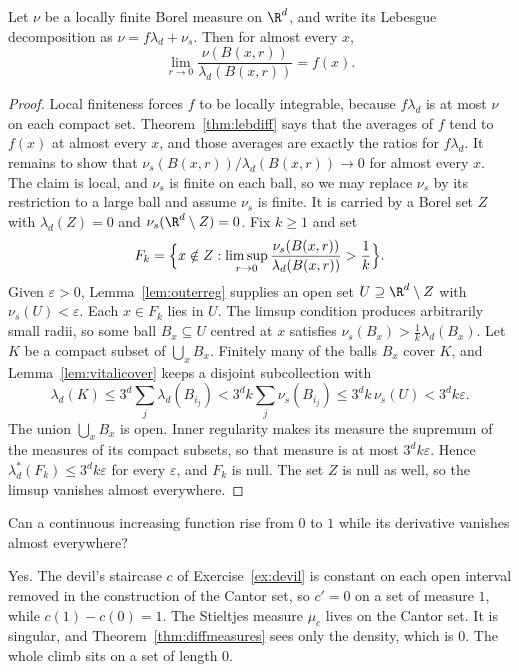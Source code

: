 \begin{theorem}\label{thm:diffmeasures}
Let $\nu$ be a locally finite Borel measure on $\R^d$, and write its Lebesgue decomposition as $\nu=f\lambda_d+\nu_s$. Then for almost every $x$,
\[\lim_{r\to0}\frac{\nu(B(x,r))}{\lambda_d(B(x,r))}=f(x).\]
\end{theorem}
\begin{proof}
Local finiteness forces $f$ to be locally integrable, because $f\lambda_d$ is at most $\nu$ on each compact set. Theorem~\ref{thm:lebdiff} says that the averages of $f$ tend to $f(x)$ at almost every $x$, and those averages are exactly the ratios for $f\lambda_d$. It remains to show that $\nu_s(B(x,r))/\lambda_d(B(x,r))\to0$ for almost every $x$. The claim is local, and $\nu_s$ is finite on each ball, so we may replace $\nu_s$ by its restriction to a large ball and assume $\nu_s$ is finite. It is carried by a Borel set $Z$ with $\lambda_d(Z)=0$ and $\nu_s(\R^d\setminus Z)=0$. Fix $k\ge1$ and set
\[
F_k=\Bigl\{x\notin Z:\limsup_{r\to0}\frac{\nu_s(B(x,r))}{\lambda_d(B(x,r))}>\frac1k\Bigr\}.
\]
Given $\varepsilon>0$, Lemma~\ref{lem:outerreg} supplies an open set $U\supseteq\R^d\setminus Z$ with $\nu_s(U)<\varepsilon$. Each $x\in F_k$ lies in $U$. The limsup condition produces arbitrarily small radii, so some ball $B_x\subseteq U$ centred at $x$ satisfies $\nu_s(B_x)>\frac1k\lambda_d(B_x)$. Let $K$ be a compact subset of $\bigcup_xB_x$. Finitely many of the balls $B_x$ cover $K$, and Lemma~\ref{lem:vitalicover} keeps a disjoint subcollection with
\[
\lambda_d(K)\le3^d\sum_j\lambda_d(B_{i_j})<3^dk\sum_j\nu_s(B_{i_j})\le3^dk\,\nu_s(U)<3^dk\varepsilon.
\]
The union $\bigcup_xB_x$ is open. Inner regularity makes its measure the supremum of the measures of its compact subsets, so that measure is at most $3^dk\varepsilon$. Hence $\lambda_d^*(F_k)\le3^dk\varepsilon$ for every $\varepsilon$, and $F_k$ is null. The set $Z$ is null as well, so the limsup vanishes almost everywhere.
\end{proof}

\begin{think}
Can a continuous increasing function rise from $0$ to $1$ while its derivative vanishes almost everywhere?
\end{think}

Yes. The devil's staircase $c$ of Exercise~\ref{ex:devil} is constant on each open interval removed in the construction of the Cantor set, so $c'=0$ on a set of measure $1$, while $c(1)-c(0)=1$. The Stieltjes measure $\mu_c$ lives on the Cantor set. It is singular, and Theorem~\ref{thm:diffmeasures} sees only the density, which is $0$. The whole climb sits on a set of length $0$.

